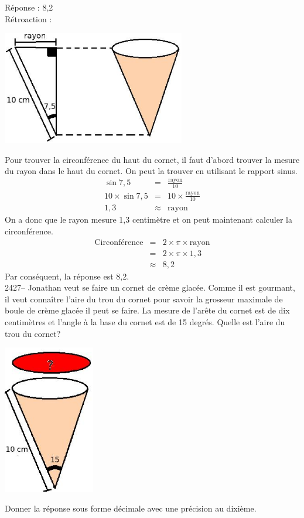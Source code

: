 \documentclass[letterpaper, 12pt]{article}
\begin{document}
R\'eponse : 8,2\\

R\'etroaction :\\
\begin{center}
 \includegraphics[width=8cm,bb=14 14 605 363]{Q2426.eps}
\end{center}
Pour trouver la circonf\'erence du haut du cornet, il faut d'abord trouver la mesure du rayon dans le haut du cornet. On peut la trouver en utilisant le rapport sinus.
\begin{eqnarray*}
 \sin{7,5}&=&\frac{\textrm{rayon}}{10}\\[2mm]
 10\times \sin{7,5}&=&10\times \frac{\textrm{rayon}}{10}\\[2mm]
 1,3&\approx&\textrm{rayon}
\end{eqnarray*}
On a donc que le rayon mesure 1,3 centim\`etre et on peut maintenant calculer la circonf\'erence.
\begin{eqnarray*}
 \textrm{Circonf\'erence}&=& 2 \times \pi \times \textrm{rayon} \\
&=& 2 \times \pi \times 1,3 \\
&\approx& 8,2
\end{eqnarray*}
Par cons\'equent, la r\'eponse est 8,2.\\

2427-- Jonathan veut se faire un cornet de cr\`eme glac\'ee. Comme il est gourmant, il veut conna\^itre l'aire du trou du cornet pour savoir la grosseur maximale de boule de cr\`eme glac\'ee il peut se faire. La mesure de l'ar\^ete du cornet est de dix centim\`etres et l'angle \`a la base du cornet est de 15 degr\'es. Quelle est l'aire du trou du cornet? \\
\begin{center}
 \includegraphics[width=4cm,bb=14 14 225 339]{Q2427.eps}
\end{center}
Donner la r\'eponse sous forme d\'ecimale avec une pr\'ecision au dixi\`eme.\\
\end{document}
